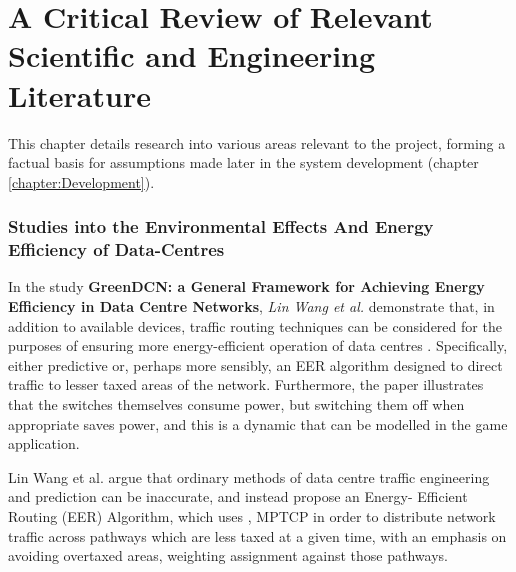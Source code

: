 \def\baselinestretch{1}

\chapter{A Critical Review of Relevant Scientific and Engineering Literature}
\label{chapter:LitReview}

\def\baselinestretch{1.66}



This chapter details research into various areas relevant to the project, forming a factual basis for assumptions made later in the system development (chapter \ref{chapter:Development}).

\goodbreak

\subsection{Studies into the Environmental Effects And Energy \newline Efficiency of Data-Centres}
\label{sec:ACriticalReviewOfReleventScientificAndEngineeringLiturature:StudiesIntoTheEnvironmentalEffectsAndEnergyEfficiencyOfDataCenters}

In the study \textbf{GreenDCN: a General Framework for Achieving Energy Efficiency in Data Centre Networks}, \emph{Lin Wang et al.} demonstrate that, in addition to available devices, traffic routing techniques can be considered for the purposes of ensuring more energy-efficient operation of data centres \cite{GreenDCN}. Specifically, either predictive or, perhaps more sensibly, an EER algorithm designed to direct traffic to lesser taxed areas of the network. Furthermore, the paper illustrates that the switches themselves consume power, but switching them off when appropriate saves power, and this is a dynamic that can be modelled in the game application.

Lin Wang et al. \cite{GreenDCN} argue that ordinary methods of data centre
traffic engineering and prediction can be inaccurate, and instead propose an Energy-
Efficient Routing (EER) Algorithm, which uses \cite{multipath routing protocol}, MPTCP
in order to distribute network traffic across pathways which are less taxed at a given time, with an emphasis on avoiding overtaxed areas, weighting assignment against those pathways.

